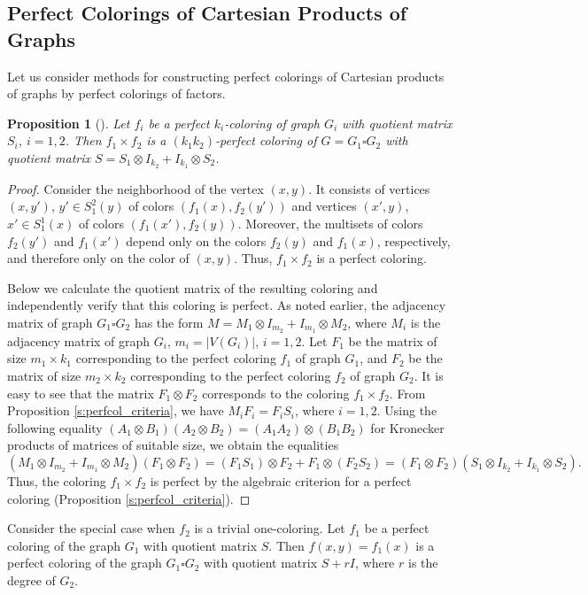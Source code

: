 \documentclass[11pt]{article}
\newtheorem{claim}{Proposition}[section]
\theoremstyle{definition}
\begin{document}
\subsection{Perfect Colorings of Cartesian Products of Graphs}

Let us consider methods for constructing perfect colorings of Cartesian
products of graphs by perfect colorings of factors.

\begin{claim}[\cite{Taranenko}]\label{cartprod:1}
Let $f_i$ be a perfect $k_i$-coloring of graph $G_i$ with quotient matrix $S_i$, $i=1,2$. Then $f_1\times f_2$ is a $(k_1k_2)$-perfect coloring of  $G=G_1\square G_2$ 
with quotient matrix $S=S_1 \otimes I_{k_2} + I_{k_1} \otimes
S_2$.
\end{claim}
\begin{proof}
Consider the neighborhood of the vertex $(x,y)$. It consists of vertices $(x,y')$,
$y'\in S^2_1(y)$ of colors $(f_1(x),f_2(y'))$ and vertices $(x',y)$,
$x'\in S^1_1(x)$ of colors $(f_1(x'),f_2(y))$. Moreover, the multisets of colors
$f_2(y')$ and $f_1(x')$ depend only on the colors $f_2(y)$ and $f_1(x)$, respectively,
and therefore only on the color of  $(x,y)$. Thus, $f_1\times f_2$ is a perfect coloring.

Below we calculate the quotient  matrix of the resulting coloring and independently
verify that this coloring is perfect. As noted earlier, the adjacency matrix of graph $G_1\square G_2$ has the form $M=M_1 \otimes
I_{m_2} + I_{m_1} \otimes M_2$, where $M_i$
is the adjacency matrix of graph $G_i$, $m_i=|V(G_i)|$, $i=1,2$. Let
$F_1$
be the matrix of size $m_1\times k_1$ corresponding to the perfect
coloring $f_1$ of graph $G_1$, and $F_2$ be the matrix of size $m_2\times k_2$ corresponding to the perfect coloring $f_2$ of graph $G_2$. It is easy to see that
the matrix $F_1\otimes F_2$  corresponds to the coloring $f_1\times
f_2$. From Proposition
\ref{s:perfcol_criteria}, we have $M_iF_i=F_iS_i$, where $i=1,2$. Using
the following equality $(A_1\otimes B_1)(A_2\otimes B_2)=
(A_1A_2)\otimes (B_1B_2)$ for Kronecker products of matrices
of suitable size, we obtain the equalities
$$(M_1 \otimes I_{m_2} + I_{m_1} \otimes M_2)(F_1\otimes F_2)=
(F_1S_1)\otimes F_2+ F_1\otimes (F_2S_2)=(F_1\otimes F_2)(S_1
\otimes I_{k_2} + I_{k_1} \otimes S_2).$$ Thus, the coloring
$f_1\times f_2$ is perfect by the algebraic criterion
for a perfect coloring (Proposition \ref{s:perfcol_criteria}).
\end{proof}

Consider the special case when $f_2$ is a trivial one-coloring. Let $f_1$
be a perfect coloring of the graph $G_1$ with quotient matrix $S$.
Then $f(x,y)=f_1(x)$ is a perfect coloring of the graph $G_1\square
G_2$ with quotient matrix $S+rI$, where $r$ is the degree of $G_2$.
\end{document}
